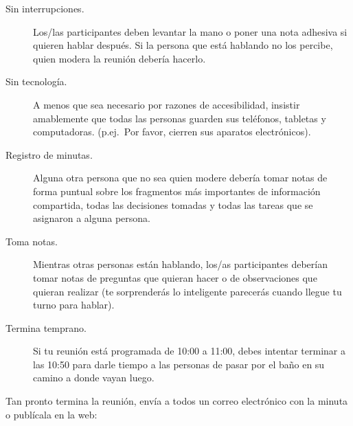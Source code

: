 \begin{description}
\item[Sin interrupciones.]
  Los/las participantes deben levantar la mano o poner una nota adhesiva
  si quieren hablar después.
  Si la persona que está hablando no los percibe,
  quien modera la reunión debería hacerlo.

\item[Sin tecnología.]
  A menos que sea necesario por razones de accesibilidad,
  insistir amablemente que todas las personas
  guarden sus teléfonos, tabletas y computadoras.
  (p.ej.\ Por favor, cierren sus aparatos electrónicos).

\item[Registro de minutas.]
  Alguna otra persona que no sea quien modere 
  debería tomar notas de forma puntual sobre 
  los fragmentos más importantes de información compartida,
  todas las decisiones tomadas
  y todas las tareas que se asignaron a alguna persona.

\item[Toma notas.]
  Mientras otras personas están hablando,
  los/as participantes deberían tomar notas de preguntas 
  que quieran hacer o de observaciones que quieran realizar
  (te sorprenderás lo inteligente parecerás 
  cuando llegue tu turno para hablar).

\item[Termina temprano.]
  Si tu reunión está programada de 10:00 a 11:00,
  debes intentar terminar a las 10:50 para darle tiempo 
  a las personas de pasar por el baño 
  en su camino a donde vayan luego.

\end{description}

Tan pronto termina la reunión,
envía a todos un correo electrónico con la minuta o publícala en la web:

